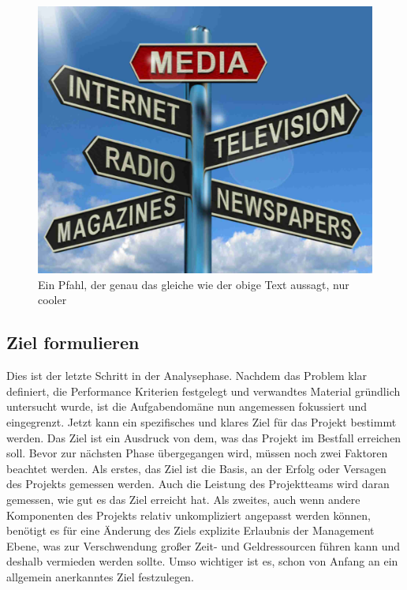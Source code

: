     \begin{figure}[H]
        \centering
        \includegraphics[width=0.5\linewidth]{graphics/media.jpg}
        \caption[Arten von Medien]{Ein Pfahl, der genau das gleiche wie der obige Text aussagt, nur cooler}

        
        \label{fig:medien}
    \end{figure}

    \subsection{Ziel formulieren}

    Dies ist der letzte Schritt in der Analysephase. Nachdem das Problem klar definiert, die 
    Performance Kriterien festgelegt und verwandtes Material gründlich untersucht wurde, ist die 
    Aufgabendomäne nun angemessen fokussiert und eingegrenzt. Jetzt kann ein spezifisches und 
    klares Ziel für das Projekt bestimmt werden. Das Ziel ist ein Ausdruck von dem, was das Projekt 
    im Bestfall erreichen soll. Bevor zur nächsten Phase übergegangen wird, müssen noch zwei 
    Faktoren beachtet werden. 
    Als erstes, das Ziel ist die Basis, an der Erfolg oder Versagen des Projekts gemessen 
    werden. Auch die Leistung des Projektteams wird daran gemessen, wie gut es das Ziel erreicht hat. 
    Als zweites, auch wenn andere Komponenten des Projekts relativ unkompliziert angepasst 
    werden können, benötigt es für eine Änderung des Ziels explizite Erlaubnis der Management 
    Ebene, was zur Verschwendung großer Zeit- und Geldressourcen führen kann und deshalb vermieden 
    werden sollte. Umso wichtiger ist es, schon von Anfang an ein allgemein anerkanntes Ziel festzulegen.

    
    

